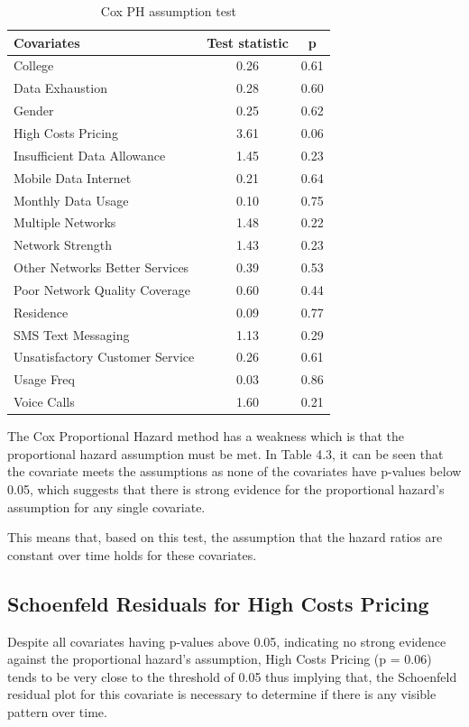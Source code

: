 \documentclass[doublespacing]{report} %
\begin{document}
\begin{table}[H]
\centering
\begin{tabular}{lcc}
\toprule
\textbf{Covariates} & \textbf{Test statistic} & \textbf{p} \\
\midrule
College & 0.26 & 0.61 \\
Data Exhaustion & 0.28 & 0.60 \\
Gender & 0.25 & 0.62 \\
High Costs Pricing & 3.61 & 0.06 \\
Insufficient Data Allowance & 1.45 & 0.23 \\
Mobile Data Internet & 0.21 & 0.64 \\
Monthly Data Usage & 0.10 & 0.75 \\
Multiple Networks & 1.48 & 0.22 \\
Network Strength & 1.43 & 0.23 \\
Other Networks Better Services & 0.39 & 0.53 \\
Poor Network Quality Coverage & 0.60 & 0.44 \\
Residence & 0.09 & 0.77 \\
SMS Text Messaging & 1.13 & 0.29 \\
Unsatisfactory Customer Service & 0.26 & 0.61 \\
Usage Freq & 0.03 & 0.86 \\
Voice Calls & 1.60 & 0.21 \\
\bottomrule
\end{tabular}
\caption{Cox PH assumption test}
\end{table}

The Cox Proportional Hazard method has a weakness which is that the proportional hazard assumption must be met. In Table 4.3, it can be seen that the covariate meets the assumptions as none of the covariates have p-values below 0.05, which suggests that there is strong evidence for the proportional hazard’s assumption for any single covariate.

This means that, based on this test, the assumption that the hazard ratios are constant over time holds for these covariates.

\subsection{Schoenfeld Residuals for High Costs Pricing}

Despite all covariates having p-values above 0.05, indicating no strong evidence against the proportional hazard’s assumption, High Costs Pricing (p = 0.06) tends to be very close to the threshold of 0.05 thus implying that, the Schoenfeld residual plot for this covariate is necessary to determine if there is any visible pattern over time. 
\end{document}
